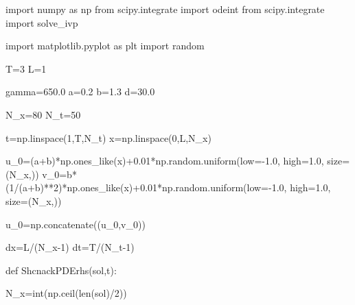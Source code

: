 \documentclass[
  letterpaper,
  DIV=11,
  numbers=noendperiod]{scrreprt}
\newenvironment{Shaded}{\begin{snugshade}}{\end{snugshade}}
\newcommand{\BuiltInTok}[1]{\textcolor[rgb]{0.00,0.23,0.31}{#1}}
\newcommand{\DecValTok}[1]{\textcolor[rgb]{0.68,0.00,0.00}{#1}}
\newcommand{\FloatTok}[1]{\textcolor[rgb]{0.68,0.00,0.00}{#1}}
\newcommand{\ImportTok}[1]{\textcolor[rgb]{0.00,0.46,0.62}{#1}}
\newcommand{\KeywordTok}[1]{\textcolor[rgb]{0.00,0.23,0.31}{#1}}
\newcommand{\NormalTok}[1]{\textcolor[rgb]{0.00,0.23,0.31}{#1}}
\newcommand{\OperatorTok}[1]{\textcolor[rgb]{0.37,0.37,0.37}{#1}}
\theoremstyle{plain}
\theoremstyle{definition}
\theoremstyle{plain}
\theoremstyle{remark}
\begin{document}
\begin{Shaded}
\begin{Highlighting}[]
\ImportTok{import}\NormalTok{ numpy }\ImportTok{as}\NormalTok{ np}
\ImportTok{from}\NormalTok{ scipy.integrate }\ImportTok{import}\NormalTok{ odeint}
\ImportTok{from}\NormalTok{ scipy.integrate }\ImportTok{import}\NormalTok{ solve\_ivp}

\ImportTok{import}\NormalTok{ matplotlib.pyplot }\ImportTok{as}\NormalTok{ plt}
\ImportTok{import}\NormalTok{ random}

\NormalTok{T}\OperatorTok{=}\DecValTok{3}
\NormalTok{L}\OperatorTok{=}\DecValTok{1}

\NormalTok{gamma}\OperatorTok{=}\FloatTok{650.0}
\NormalTok{a}\OperatorTok{=}\FloatTok{0.2}
\NormalTok{b}\OperatorTok{=}\FloatTok{1.3}
\NormalTok{d}\OperatorTok{=}\FloatTok{30.0}

\NormalTok{N\_x}\OperatorTok{=}\DecValTok{80}
\NormalTok{N\_t}\OperatorTok{=}\DecValTok{50}

\NormalTok{t}\OperatorTok{=}\NormalTok{np.linspace(}\DecValTok{1}\NormalTok{,T,N\_t)}
\NormalTok{x}\OperatorTok{=}\NormalTok{np.linspace(}\DecValTok{0}\NormalTok{,L,N\_x)}

\NormalTok{u\_0}\OperatorTok{=}\NormalTok{(a}\OperatorTok{+}\NormalTok{b)}\OperatorTok{*}\NormalTok{np.ones\_like(x)}\OperatorTok{+}\FloatTok{0.01}\OperatorTok{*}\NormalTok{np.random.uniform(low}\OperatorTok{={-}}\FloatTok{1.0}\NormalTok{, high}\OperatorTok{=}\FloatTok{1.0}\NormalTok{, size}\OperatorTok{=}\NormalTok{(N\_x,))}
\NormalTok{v\_0}\OperatorTok{=}\NormalTok{b}\OperatorTok{*}\NormalTok{(}\DecValTok{1}\OperatorTok{/}\NormalTok{(a}\OperatorTok{+}\NormalTok{b)}\OperatorTok{**}\DecValTok{2}\NormalTok{)}\OperatorTok{*}\NormalTok{np.ones\_like(x)}\OperatorTok{+}\FloatTok{0.01}\OperatorTok{*}\NormalTok{np.random.uniform(low}\OperatorTok{={-}}\FloatTok{1.0}\NormalTok{, high}\OperatorTok{=}\FloatTok{1.0}\NormalTok{, size}\OperatorTok{=}\NormalTok{(N\_x,))}

\NormalTok{u\_0}\OperatorTok{=}\NormalTok{np.concatenate((u\_0,v\_0))}

\NormalTok{dx}\OperatorTok{=}\NormalTok{L}\OperatorTok{/}\NormalTok{(N\_x}\OperatorTok{{-}}\DecValTok{1}\NormalTok{)}
\NormalTok{dt}\OperatorTok{=}\NormalTok{T}\OperatorTok{/}\NormalTok{(N\_t}\OperatorTok{{-}}\DecValTok{1}\NormalTok{)}

\KeywordTok{def}\NormalTok{ ShcnackPDErhs(sol,t):}

\NormalTok{    N\_x}\OperatorTok{=}\BuiltInTok{int}\NormalTok{(np.ceil(}\BuiltInTok{len}\NormalTok{(sol)}\OperatorTok{/}\DecValTok{2}\NormalTok{))}


\end{Highlighting}
\end{Shaded}
\end{document}
